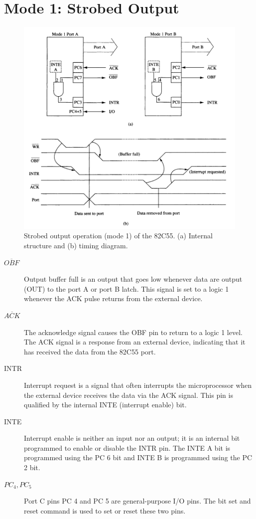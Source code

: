 \section{Mode 1: Strobed Output}
\begin{figure}[h!]
  \centering
  \includegraphics[width = 1\textwidth]{./figures/Strobed_Output.png}
  \caption{Strobed output operation (mode 1) of the 82C55. (a) Internal structure and (b) timing diagram.}
\end{figure}

\begin{description}
  \item[$\overline{OBF}$] Output buffer full is an output that goes low whenever data are output (OUT) to the port A or port B latch. This signal is set to a logic 1 whenever the ACK pulse returns from the external device.
  \item[$\overline{ACK}$] The acknowledge signal causes the OBF pin to return to a logic 1 level. The ACK signal is a response from an external device, indicating that it has received the data from the 82C55 port.
  \item[INTR] Interrupt request is a signal that often interrupts the microprocessor when the external device receives the data via the ACK signal. This pin is qualified by the internal INTE (interrupt enable) bit.
  \item[INTE] Interrupt enable is neither an input nor an output; it is an internal bit programmed to enable or disable the INTR pin. The INTE A bit is programmed using the PC 6 bit and INTE B is programmed using the PC 2 bit.
  \item[$PC_4 , PC_5$] Port C pins PC 4 and PC 5 are general-purpose I/O pins. The bit set and reset command is used to set or reset these two pins.
\end{description}

